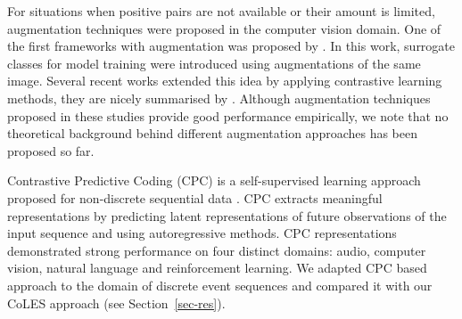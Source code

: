 \documentclass{article}
\begin{document}
For situations when positive pairs are not available or their amount is limited, augmentation techniques were proposed in the computer vision domain. One of the first frameworks with augmentation  was proposed by \cite{Dosovitskiy2014DiscriminativeUF}. In this work, surrogate classes for model training were introduced using augmentations of the same image. Several recent works \citep{Bachman2019LearningRB, He2019MomentumCF, Chen2020ASF} extended this idea by applying contrastive learning methods, they are nicely summarised by \cite{Falcon2020AFF}. Although augmentation techniques proposed in these studies provide good performance empirically, we note that no theoretical background behind different augmentation approaches has been proposed so far.

Contrastive Predictive Coding (CPC) is a self-supervised learning approach proposed for non-discrete sequential data \citep{Oord2018RepresentationLW}. CPC extracts meaningful representations by predicting latent representations of future observations of the input sequence and using autoregressive methods. CPC representations demonstrated strong performance on four distinct domains: audio, computer vision, natural language and reinforcement learning. We adapted CPC based approach to the domain of discrete event sequences and compared it with our CoLES approach (see Section~\ref{sec-res}).



\end{document}
